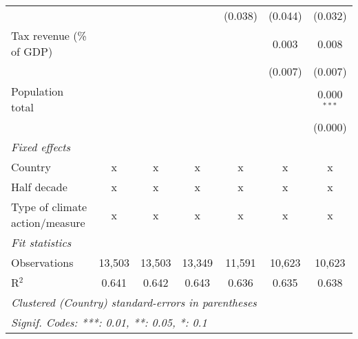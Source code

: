 \begin{tabular}{lcccccc}
                                                 &                &                &                & (0.038)        & (0.044)        & (0.032)\\   
   Tax revenue (\% of GDP)                       &                &                &                &                & 0.003          & 0.008\\   
                                                 &                &                &                &                & (0.007)        & (0.007)\\   
   Population total                              &                &                &                &                &                & 0.000$^{***}$\\   
                                                 &                &                &                &                &                & (0.000)\\   
   \emph{Fixed effects}\\
   Country                                       & x              & x              & x              & x              & x              & x\\  
   Half decade                                   & x              & x              & x              & x              & x              & x\\  
   Type of climate action/measure                & x              & x              & x              & x              & x              & x\\  
   \midrule \emph{Fit statistics}\\
   Observations                                  & 13,503         & 13,503         & 13,349         & 11,591         & 10,623         & 10,623\\  
   R$^2$                                         & 0.641          & 0.642          & 0.643          & 0.636          & 0.635          & 0.638\\  
   \midrule
   \multicolumn{7}{l}{\emph{Clustered (Country) standard-errors in parentheses}}\\
   \multicolumn{7}{l}{\emph{Signif. Codes: ***: 0.01, **: 0.05, *: 0.1}}\\
\end{tabular}
\par\endgroup


